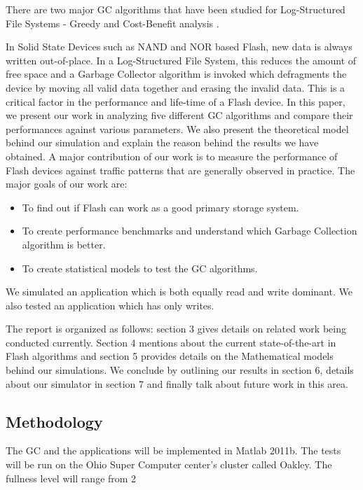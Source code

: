 \documentclass[11pt]{report} %
\begin{document}
There are two major GC algorithms that have been studied for Log-Structured File Systems - Greedy and Cost-Benefit analysis \cite{Menon98}. 

In Solid State Devices such as NAND and NOR based Flash, new data is always written out-of-place. In a Log-Structured File System, this reduces the amount of free space and a Garbage Collector algorithm is invoked which defragments the device by moving all valid data together and erasing the invalid data. This is a critical factor in the performance and life-time of a Flash device. In this paper, we present our work in analyzing five different GC algorithms and compare their performances against various parameters. We also present the theoretical model behind our simulation and explain the reason behind the results we have obtained. A major contribution of our work is to measure the performance of Flash devices against traffic patterns that are generally observed in practice.
The major goals of our work are:
\begin{itemize}
\item To find out if Flash can work as a good primary storage system. 
\item To create performance benchmarks and understand which Garbage Collection algorithm is better. 
\item To create statistical models to test the GC algorithms.
\end{itemize}

We simulated an application which is both equally read and write dominant. We also tested an application which has only writes.

The report is organized as follows: section 3 gives details on related work being conducted currently. Section 4 mentions about the current state-of-the-art in Flash algorithms and section 5 provides details on the Mathematical models behind our simulations. We conclude by outlining our results in section 6, details about our simulator in section 7 and finally talk about future work in this area.

\subsection{Methodology}
The GC and the applications will be implemented in Matlab 2011b. The tests will be run on the Ohio Super Computer center’s cluster called Oakley. The fullness level will range from 2%
\end{document}

